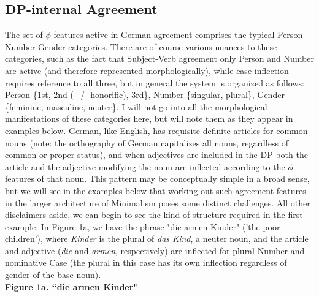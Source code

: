 \documentclass[12pt]{article}
\begin{document}
\begin{flushleft}
\subsection{DP-internal Agreement}
The set of $\phi$-features active in German agreement comprises the typical Person-Number-Gender categories. There are of course various nuances to these categories, such as the fact that Subject-Verb agreement only Person and Number are active (and therefore represented morphologically), while case inflection requires reference to all three, but in general the system is organized as follows: Person \{1st, 2nd (+/- honorific), 3rd\}, Number \{singular, plural\}, Gender \{feminine, masculine, neuter\}. I will not go into all the morphological manifestations of these categories here, but will note them as they appear in examples below. German, like English, has requisite definite articles for common nouns (note: the orthography of German capitalizes all nouns, regardless of common or proper status), and when adjectives are included in the DP both the article and the adjective modifying the noun are inflected according to the $\phi$-features of that noun. This pattern may be conceptually simple in a broad sense, but we will see in the examples below that working out such agreement features in the larger architecture of Minimalism poses some distinct challenges. All other disclaimers aside, we can begin to see the kind of structure required in the first example. In Figure 1a, we have the phrase "die armen Kinder" ('the poor children'), where {\it Kinder} is the plural of {\it das Kind}, a neuter noun, and the article and adjective ({\it die} and {\it armen}, respectively) are inflected for plural Number and nominative Case (the plural in this case has its own inflection regardless of gender of the base noun).\\
\bigskip
{\bf Figure 1a. ``die armen Kinder"} \\
\bigskip
{\centering
{}\\
}


\end{flushleft}
\end{document}
